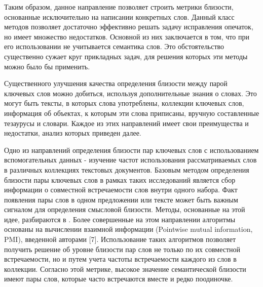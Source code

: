 Таким образом, данное направление позволяет строить метрики близости, основанные исключительно на написании конкретных слов. Данный класс методов позволяет достаточно эффективно решать задачу исправления опечаток, но имеет множество недостатков. Основной из них заключается в том, что при его использовании не учитывается семантика слов. Это обстоятельство существенно сужает круг прикладных задач, для решения которых эти методы можно было бы применить. 

Существенного улучшения качества определения близости между парой ключевых слов можно добиться, используя дополнительные знания о словах. Это могут быть тексты, в которых слова употреблены, коллекции ключевых слов, информация об объектах, к которым эти слова приписаны, вручную составленные тезаурусы и словари. Каждое из этих направлений имеет свои преимущества и недостатки, анализ которых приведен далее.

Одно из направлений определения близости пар ключевых слов с использованием вспомогательных данных - изучение частот использования рассматриваемых слов в различных коллекциях текстовых документов. Базовым методом определения близости пары ключевых слов в рамках таких исследований является сбор информации о совместной встречаемости слов внутри одного набора. Факт появления пары слов в одном предложении или тексте может быть важным сигналом для определения смысловой близости. Методы, основанные на этой идее, разбираются в \cite{freq_1,freq_2,pmi}. Более совершенные на этом направлении алгоритмы основаны на вычислении взаимной информации (Pointwise mutual information, PMI), введенной авторами [7]. Использование таких алгоритмов позволяет получить решение об уровне близости пар слов  не только по их совместной встречаемости, но и путем учета частоты встречаемости каждого из слов в коллекции. Согласно этой метрике, высокое значение семантической близости имеют пары слов, которые часто встречаются вместе и редко поодиночке. 

